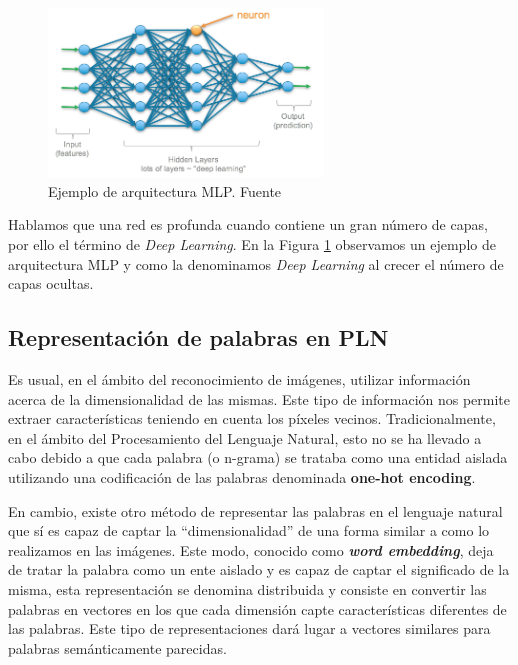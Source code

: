\begin{figure}[!ht]
	\centering
	\includegraphics[width=0.65\textwidth]{images/arte/mlp}
	\caption{Ejemplo de arquitectura MLP. Fuente \cite{mlp}}
	\label{fig:mlp}
\end{figure}



Hablamos que una red es profunda cuando contiene un gran número de capas, por ello el término de \textit{Deep Learning}. En la Figura \ref{fig:mlp} observamos un ejemplo de arquitectura MLP y como la denominamos \textit{Deep Learning} al crecer el número de capas ocultas.


\subsection{Representación de palabras en PLN}%

Es usual, en el ámbito del reconocimiento de imágenes, utilizar información acerca de la dimensionalidad de las mismas. Este tipo de información nos permite extraer características  teniendo en cuenta los píxeles vecinos. Tradicionalmente, en el ámbito del Procesamiento del Lenguaje Natural, esto no se ha llevado a cabo debido a que cada palabra (o n-grama) se trataba como una entidad aislada utilizando una codificación de las palabras denominada \textbf{one-hot encoding}. 

En cambio, existe otro método de representar las palabras en el lenguaje natural que sí es capaz de captar la ``dimensionalidad'' de una forma similar a como lo realizamos en las imágenes. Este modo, conocido como \textit{\textbf{word embedding}}, deja de tratar la palabra como un ente aislado y  es capaz de captar el significado de la misma, esta representación se denomina distribuida y consiste en convertir las palabras en vectores en los que cada dimensión capte características diferentes de las palabras. Este tipo de representaciones dará lugar a vectores similares para palabras semánticamente parecidas. 


